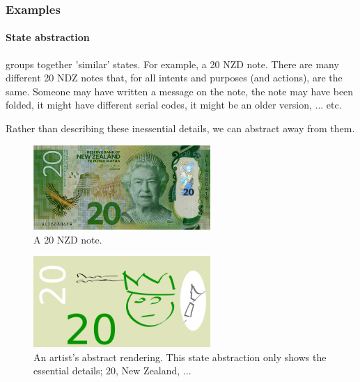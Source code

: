 


\subsubsection{Examples}

\paragraph{State abstraction} groups together 'similar' states. For example, a 20 NZD note.
There are many different 20 NDZ notes that, for all intents and purposes (and actions), are the same.
Someone may have written a message on the note, the note may have been folded,
it might have different serial codes, it might be an older version, ... etc.

Rather than describing these inessential details, we can abstract away from them.

\begin{figure}[h!]
\centering
\includegraphics[width=0.6\textwidth,height=0.175\textheight]{../../pictures/images/nz20.png}
\caption{A 20 NZD note.}
\end{figure}

\begin{figure}[h!]
\centering
\includegraphics[width=0.6\textwidth,height=0.175\textheight]{../../pictures/drawings/my-nz20.png}
\caption{An artist's abstract rendering. This state abstraction only shows the essential details; $20$, New Zealand, ...}
\end{figure}

